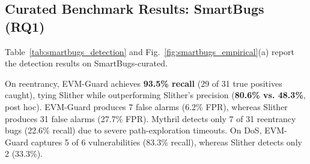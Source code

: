 \documentclass[conference]{IEEEtran}
\begin{document}
\begin{table}[t]
\centering
\small
\renewcommand{\arraystretch}{1.12}
\caption{Per-Category Detection Performance on SmartBugs-Curated (143 Files, 216 Bytecodes)}
\label{tab:smartbugs_detection}
\end{table}

\subsection{Curated Benchmark Results: SmartBugs (RQ1)}
Table~\ref{tab:smartbugs_detection} and Fig.~\ref{fig:smartbugs_empirical}(a) report the detection results on SmartBugs-curated. 

On reentrancy, EVM-Guard achieves \textbf{93.5\% recall} (29 of 31 true positives caught), tying Slither while outperforming Slither's precision (\textbf{80.6\% vs. 48.3\%}, post hoc). EVM-Guard produces 7 false alarms (6.2\% FPR), whereas Slither produces 31 false alarms (27.7\% FPR). Mythril detects only 7 of 31 reentrancy bugs (22.6\% recall) due to severe path-exploration timeouts. On DoS, EVM-Guard captures 5 of 6 vulnerabilities (83.3\% recall), whereas Slither detects only 2 (33.3\%).
\end{document}
